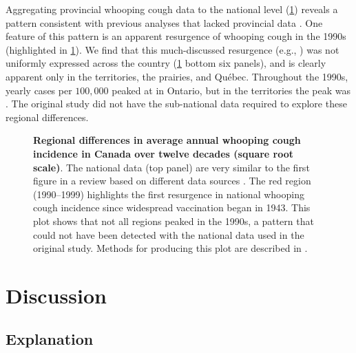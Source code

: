 \documentclass[12pt]{article}
\begin{document}
Aggregating provincial whooping cough data to the national level (\cref{fig:whooping-plot}) reveals a pattern consistent with previous analyses that lacked provincial data \cite{thommes2020revisiting}. One feature of this pattern is an apparent resurgence of whooping cough in the 1990s (highlighted in \cref{fig:whooping-plot}). We find that this much-discussed resurgence (e.g., \cite{thommes2020revisiting}) was not uniformly expressed across the country (\cref{fig:whooping-plot} bottom six panels), and is clearly apparent only in the territories, the prairies, and Qu\'ebec. Throughout the 1990s, yearly cases per $100,000$ peaked at  in Ontario, but in the territories the peak was . The original study \cite{thommes2020revisiting} did not have the sub-national data required to explore these regional differences.

\begin{figure}[!htb]
\caption{\textbf{Regional \cite{SGC2021} differences in average annual whooping cough incidence in Canada over twelve decades (square root scale)}. The national data (top panel) are very similar to the first figure in a review based on different data sources \cite{thommes2020revisiting}. The red region (1990--1999) highlights the first resurgence in national whooping cough incidence since widespread vaccination began in 1943. This plot shows that not all regions peaked in the 1990s, a pattern that could not have been detected with the national data used in the original study. Methods for producing this plot are described in .}\label{fig:whooping-plot}
\end{figure}

\section{Discussion}\label{sec:interpretation}

\subsection{Explanation}\label{sec:explanation}
\end{document}
